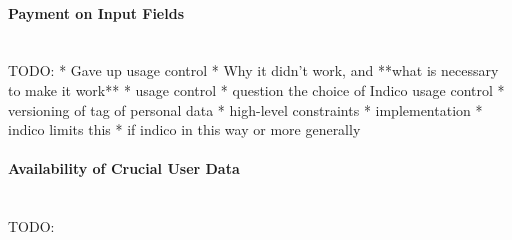 \paragraph{Payment on Input Fields}\mbox{}\\

TODO:
* Gave up usage control
  * Why it didn't work, and **what is necessary to make it work**
    * usage control
    * question the choice of Indico usage control
    * versioning of tag of personal data
* high-level constraints
* implementation
  * indico limits this
* if indico in this way or more generally
\vspace{0.5cm}
\paragraph{Availability of Crucial User Data}\mbox{}\\
TODO:
